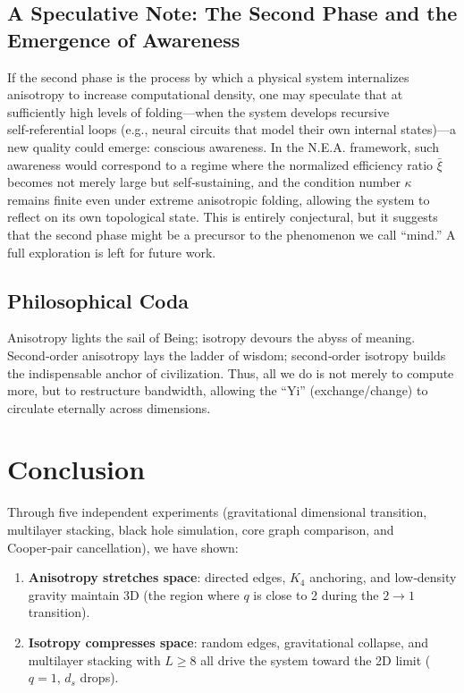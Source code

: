 \documentclass[12pt,a4paper]{article}
\begin{document}
\subsection{A Speculative Note: The Second Phase and the Emergence of Awareness}

If the second phase is the process by which a physical system internalizes anisotropy to increase computational density, one may speculate that at sufficiently high levels of folding—when the system develops recursive self‑referential loops (e.g., neural circuits that model their own internal states)—a new quality could emerge: conscious awareness. In the N.E.A. framework, such awareness would correspond to a regime where the normalized efficiency ratio $\bar{\xi}$ becomes not merely large but self‑sustaining, and the condition number $\kappa$ remains finite even under extreme anisotropic folding, allowing the system to reflect on its own topological state. This is entirely conjectural, but it suggests that the second phase might be a precursor to the phenomenon we call “mind.” A full exploration is left for future work.

\subsection{Philosophical Coda}

Anisotropy lights the sail of Being; isotropy devours the abyss of meaning. Second‑order anisotropy lays the ladder of wisdom; second‑order isotropy builds the indispensable anchor of civilization. Thus, all we do is not merely to compute more, but to restructure bandwidth, allowing the “Yi” (exchange/change) to circulate eternally across dimensions.

\section{Conclusion}

Through five independent experiments (gravitational dimensional transition, multilayer stacking, black hole simulation, core graph comparison, and Cooper‑pair cancellation), we have shown:

\begin{enumerate}
    \item \textbf{Anisotropy stretches space}: directed edges, $K_4$ anchoring, and low‑density gravity maintain 3D (the region where $q$ is close to 2 during the $2\to1$ transition).
    \item \textbf{Isotropy compresses space}: random edges, gravitational collapse, and multilayer stacking with $L\ge8$ all drive the system toward the 2D limit ($q=1$, $d_s$ drops).
\end{enumerate}
\end{document}
